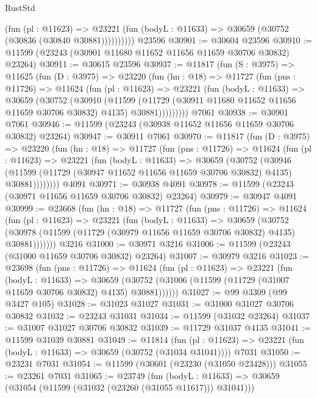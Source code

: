 \begin{lexlean}{RustStd}
\begin{coremodule}
              (fun (pl : @11623) =>
              @23221 (fun (bodyL : @11633) => @30659 (@30752 (@30836 (@30840 @30881))))))))))
    @23596
@30901 := @30604 @23596
@30910 := @11599 (@23243 (@30901 @11680 @11652 @11656 @11659 @30706 @30832) @23264)
@30911 := @30615 @23596
@30937 := @11817
    (fun (S : @3975) =>
    @11625
      (fun (D : @3975) =>
      @23220
        (fun (hn : @18) =>
        @11727
          (fun (pns : @11726) =>
          @11624
            (fun (pl : @11623) =>
            @23221
              (fun (bodyL : @11633) =>
              @30659
                (@30752
                  (@30910
                    (@11599
                      (@11729 (@30911 @11680 @11652 @11656 @11659 @30706 @30832) @4135)
                      @30881)))))))))
    @7061
@30938 := @30901 @7061
@30946 := @11599 (@23243 (@30938 @11652 @11656 @11659 @30706 @30832) @23264)
@30947 := @30911 @7061
@30970 := @11817
    (fun (D : @3975) =>
    @23220
      (fun (hn : @18) =>
      @11727
        (fun (pns : @11726) =>
        @11624
          (fun (pl : @11623) =>
          @23221
            (fun (bodyL : @11633) =>
            @30659
              (@30752
                (@30946
                  (@11599 (@11729 (@30947 @11652 @11656 @11659 @30706 @30832) @4135) @30881))))))))
    @4091
@30971 := @30938 @4091
@30978 := @11599 (@23243 (@30971 @11656 @11659 @30706 @30832) @23264)
@30979 := @30947 @4091
@30999 := @23668
    (fun (hn : @18) =>
    @11727
      (fun (pns : @11726) =>
      @11624
        (fun (pl : @11623) =>
        @23221
          (fun (bodyL : @11633) =>
          @30659
            (@30752
              (@30978 (@11599 (@11729 (@30979 @11656 @11659 @30706 @30832) @4135) @30881)))))))
    @3216
@31000 := @30971 @3216
@31006 := @11599 (@23243 (@31000 @11659 @30706 @30832) @23264)
@31007 := @30979 @3216
@31023 := @23698
    (fun (pns : @11726) =>
    @11624
      (fun (pl : @11623) =>
      @23221
        (fun (bodyL : @11633) =>
        @30659 (@30752 (@31006 (@11599 (@11729 (@31007 @11659 @30706 @30832) @4135) @30881))))))
@31027 := @99 @3309 (@99 @3427 @105)
@31028 := @31023 @31027
@31031 := @31000 @31027 @30706 @30832
@31032 := @23243 @31031
@31034 := @11599 (@31032 @23264)
@31037 := @31007 @31027 @30706 @30832
@31039 := @11729 @31037 @4135
@31041 := @11599 @31039 @30881
@31049 := @11814
    (fun (pl : @11623) => @23221 (fun (bodyL : @11633) => @30659 (@30752 (@31034 @31041))))
    @7031
@31050 := @23231 @7031
@31054 := @11599 (@30601 (@23230 (@31050 @23428)))
@31055 := @23261 @7031
@31065 := @23749
    (fun (bodyL : @11633) => @30659 (@31054 (@11599 (@31032 (@23260 (@31055 @11617))) @31041)))

\end{coremodule}
\end{lexlean}
